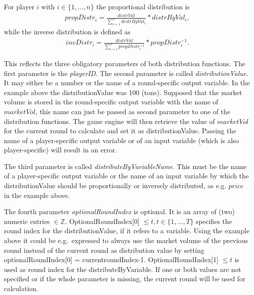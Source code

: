 For player $i$ with $i\in\{1,\dots, n\}$ the proportional distribution is
\begin{align}
    propDistr_i=\frac{distrVal}{\sum_{i=1}^n distrByVal_i}*distrByVal_i,
\end{align}
while the inverse distribution is defined as
\begin{align}
    invDistr_i=\frac{distrVal}{\sum_{i=1}^n propDistr_i^{-1}}*propDistr_i^{-1}.
\end{align}

This reflects the three obligatory parameters of both distribution functions. The first parameter is the \textit{playerID}. The second parameter is called \textit{distributionValue}. It may either be a number or the name of a round-specific output variable. In the example above the distributionValue was 100 (tons). Supposed that the market volume is stored in the round-specific output variable with the name of $marketVol$, this name can just be passed as second parameter to one of the distribution functions. The game engine will then retrieve the value of $marketVol$ for the current round to calculate and set it as distributionValue. Passing the name of a player-specific output variable or of an input variable (which is also player-specific) will result in an error.

The third parameter is called \textit{distributeByVariableName}. This must be the name of a player-specific output variable or the name of an input variable by which the distributionValue should be proportionally or inversely distributed, as e.g. $price$ in the example above. 

The fourth parameter \textit{optionalRoundIndex} is optional. It is an array of (two) numeric entries $\in \mathbb{Z}$. OptionalRoundIndex[0] $\le t,t\in\{1,\dots, T\}$ specifies the round index for the distributionValue, if it refers to a variable. Using the example above it could be e.g.~expressed to always use the market volume of the previous round instead of the current round as distribution value by setting optionalRoundIndex[0] = currentroundIndex-1. \mbox{OptionalRoundIndex[1]} $\le t$
is used as round index for the distributeByVariable. If one or both values are not specified or if the whole parameter is missing, the current round will be used for calculation.


